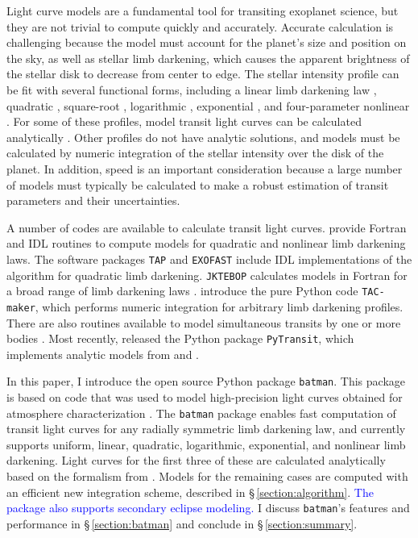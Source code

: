 \documentclass[12pt,preprint]{aastex}
\newcommand*{\blue}{\textcolor{blue}}
\begin{document}
Light curve models are a fundamental tool for transiting exoplanet science, but they are not trivial to compute quickly and accurately.  Accurate calculation is challenging because the model must account for the planet's size and position on the sky, as well as stellar limb darkening, which causes the apparent brightness of the stellar disk to decrease from center to edge.  The  stellar intensity profile can be fit with several functional forms, including a linear limb darkening law \citep{schwarzschild06}, quadratic \citep{kopal50}, square-root \citep{diaz-cordoves92}, logarithmic \citep{klinglesmith70}, exponential \citep{claret03}, and four-parameter nonlinear \citep{claret00}.  For some of these profiles, model transit light curves can be calculated analytically \citep{mandel02, gimenez06, abubekerov13}.  Other profiles do not have analytic solutions, and models must be calculated by numeric integration of the stellar intensity over the disk of the planet. In addition, speed is an important consideration because a large number of models must typically be calculated to make a robust estimation of transit parameters and their uncertainties.

A number of codes are available to calculate transit light curves. \cite{mandel02} provide Fortran and IDL routines to compute models for quadratic and nonlinear limb darkening laws. The software packages \texttt{TAP} \citep{gazak12} and \texttt{EXOFAST} \citep{eastman13} include IDL implementations of the \cite{mandel02} algorithm for quadratic limb darkening. \texttt{JKTEBOP} calculates models in Fortran for a broad range of limb darkening laws \citep{southworth04}. \cite{kjurkchieva13} introduce the pure Python code \texttt{TAC-maker}, which performs numeric integration for arbitrary limb darkening profiles. There are also routines available to model simultaneous transits by one or more bodies \citep{kipping11, pal12}.  Most recently, \cite{parvianinen15} released the Python package \texttt{PyTransit}, which implements analytic models from \cite{mandel02} and \cite{gimenez06}.  

In this paper, I introduce the open source Python package \texttt{batman}.  This package is based on code that was used to model high-precision light curves obtained for atmosphere characterization \citep{kreidberg14b, kreidberg14a, kreidberg15, stevenson14c, stevenson14b, stevenson14a, stevenson14d}.  The \texttt{batman} package enables fast computation of transit light curves for any radially symmetric limb darkening law, and currently supports uniform, linear, quadratic, logarithmic, exponential, and nonlinear limb darkening. Light curves for the first three of these are calculated analytically based on the formalism from \cite{mandel02}.  Models for the remaining cases are computed with an efficient new integration scheme, described in \S\,\ref{section:algorithm}. \blue{The package also supports secondary eclipse modeling.} I discuss \texttt{batman}'s features and performance in \S\,\ref{section:batman} and conclude in \S\,\ref{section:summary}.
\end{document}
